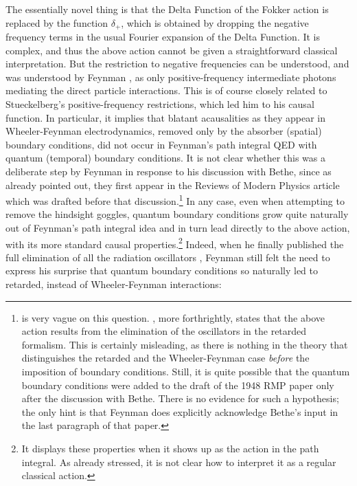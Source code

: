 \documentclass[12pt,a4paper]{article}
\begin{document}
The essentially novel thing is that the Delta Function of the Fokker action is replaced by the function $\delta_+$, which is obtained by dropping the negative frequency terms in the usual Fourier expansion of the Delta Function. It is complex, and thus the above action cannot be given a straightforward classical interpretation. But the restriction to negative frequencies can be understood, and was understood by Feynman \citep[p.772]{feynman_1949_space-time}, as only positive-frequency intermediate photons mediating the direct particle interactions. This is of course closely related to Stueckelberg's positive-frequency restrictions, which led him to his causal function. In particular, it implies that blatant acausalities as they appear in Wheeler-Feynman electrodynamics, removed only by the absorber (spatial) boundary conditions, did not occur in Feynman's path integral QED with quantum (temporal) boundary conditions. It is not clear whether this was a deliberate step by Feynman in response to his discussion with Bethe, since as already pointed out, they first appear in the Reviews of Modern Physics article which was drafted before that discussion.\footnote{\label{fn:bethe} \citep[p. 231]{mehra_1994_the-beat} is very vague on this question. \citep[p. 479]{schweber_1986_feynman}, more forthrightly, states that the above action results from the elimination of the oscillators in the retarded formalism. This is certainly misleading, as there is nothing in the theory that distinguishes the retarded and the Wheeler-Feynman case \emph{before} the imposition of boundary conditions. Still, it is quite possible that the quantum boundary conditions were added to the draft of the 1948 RMP paper only after the discussion with Bethe. There is no evidence for such a hypothesis; the only hint is that Feynman does explicitly acknowledge Bethe's input in the last paragraph of that paper.} In any case, even when attempting to remove the hindsight goggles, quantum boundary conditions grow quite naturally out of Feynman's path integral idea and in turn lead directly to the above action, with its more standard causal properties.\footnote{It displays these properties when it shows up as the action in the path integral. As already stressed, it is not clear how to interpret it as a regular classical action.} Indeed, when he finally published the full elimination of all the radiation oscillators \citep{feynman_1950_mathematical}, Feynman still felt the need to express his surprise that quantum boundary conditions so naturally led to retarded, instead of Wheeler-Feynman interactions:
\end{document}
